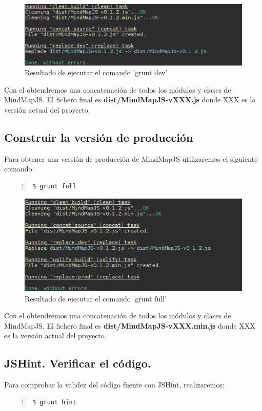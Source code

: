 \begin{figure}[tbph]
\centering
\includegraphics[width=0.6\linewidth]{imagenes/grunt-dev}
\caption{Resultado de ejecutar el comando 'grunt dev'}
\label{fig:grunt-dev}
\end{figure}


Con el obtendremos una concatenación de todos los módulos y clases de MindMapJS. El fichero final es \textbf{dist/MindMapJS-vXXX.js} donde XXX es la versión actual del proyecto.

\subsection{Construir la versión de producción}
Para obtener una versión de producción de MindMapJS utilizaremos el siguiente comando.

\begin{lstlisting}[language=bash, numbers=left]
$ grunt full
\end{lstlisting}

\begin{figure}[tbph]
\centering
\includegraphics[width=0.5\linewidth]{imagenes/grunt-full}
\caption{Resultado de ejecutar el comando 'grunt full'}
\label{fig:grunt-full}
\end{figure}


Con el obtendremos una concatenación de todos los módulos y clases de MindMapJS. El fichero final es \textbf{dist/MindMapJS-vXXX.min.js} donde XXX es la versión actual del proyecto.

\subsection {JSHint. Verificar el código.}
Para comprobar la validez del código fuente con JSHint, realizaremos:

\begin{lstlisting}[language=bash, numbers=left]
$ grunt hint
\end{lstlisting}

